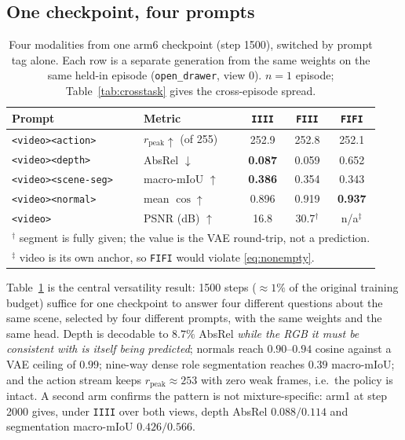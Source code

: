 \documentclass{article} %
\newcommand{\ptag}[1]{\texttt{<#1>}}   %
\newcommand{\best}[1]{\textbf{#1}}
\newcommand{\tabref}[1]{Table~\ref{#1}}
\begin{document}
\subsection{One checkpoint, four prompts}

\begin{table}[t]
\caption{Four modalities from one arm6 checkpoint (step 1500), switched by prompt tag alone. Each
row is a separate generation from the same weights on the same held-in episode
(\texttt{open\_drawer}, view 0). $n{=}1$ episode; \tabref{tab:crosstask} gives the cross-episode
spread.}
\label{tab:versatility}
\begin{center}\small
\begin{tabular}{llccc}
\toprule
\textbf{Prompt} & \textbf{Metric} & \texttt{IIII} & \texttt{FIII} & \texttt{FIFI} \\
\midrule
\ptag{video}\ptag{action}    & $r_{\text{peak}}\uparrow$ (of 255) & 252.9 & 252.8 & 252.1 \\
\ptag{video}\ptag{depth}     & AbsRel $\downarrow$   & \best{0.087} & 0.059 & 0.652 \\
\ptag{video}\ptag{scene-seg} & macro-mIoU $\uparrow$ & \best{0.386} & 0.354 & 0.343 \\
\ptag{video}\ptag{normal}    & mean $\cos\uparrow$   & 0.896 & 0.919 & \best{0.937} \\
\ptag{video}                 & PSNR (dB) $\uparrow$  & 16.8 & 30.7$^\dagger$ & n/a$^\ddagger$ \\
\bottomrule
\multicolumn{5}{l}{\scriptsize $^\dagger$ segment is fully given; the value is the VAE round-trip, not a prediction.}\\
\multicolumn{5}{l}{\scriptsize $^\ddagger$ video is its own anchor, so \texttt{FIFI} would violate \eqref{eq:nonempty}.}
\end{tabular}
\end{center}
\end{table}

\tabref{tab:versatility} is the central versatility result: 1500 steps (${\approx}1\%$ of the
original training budget) suffice for one checkpoint to answer four different questions about the
same scene, selected by four different prompts, with the same weights and the same head. Depth is
decodable to $8.7\%$ AbsRel \emph{while the RGB it must be consistent with is itself being
predicted}; normals reach $0.90$--$0.94$ cosine against a VAE ceiling of $0.99$; nine-way dense
role segmentation reaches $0.39$ macro-mIoU; and the action stream keeps
$r_{\text{peak}}\approx253$ with zero weak frames, i.e.\ the policy is intact. A second arm
confirms the pattern is not mixture-specific: arm1 at step 2000 gives, under \texttt{IIII} over
both views, depth AbsRel $0.088/0.114$ and segmentation macro-mIoU $0.426/0.566$.
\end{document}
